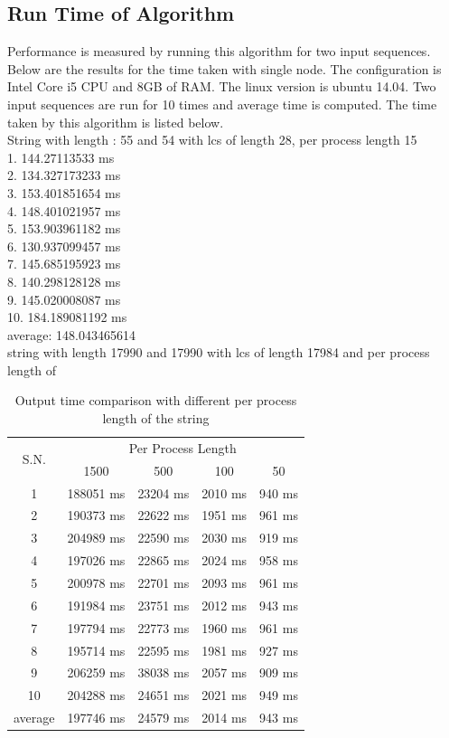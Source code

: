 \documentclass[journal,twoside]{IEEEtran}
\begin{document}
\subsection{Run Time of Algorithm}
Performance is measured by running this algorithm for two input sequences. Below are the results for the time taken with single node. The configuration is Intel Core i5 CPU and 8GB of RAM. The linux version is ubuntu 14.04. Two input sequences are run  for 10 times and average time is computed. The time taken by this algorithm is listed below. 
\\
String with length : 55 and 54 with lcs of length 28, per process length 15\\
1. 144.27113533  ms\\
2. 134.327173233  ms\\
3. 153.401851654  ms\\
4. 148.401021957  ms\\
5. 153.903961182  ms\\
6. 130.937099457  ms\\
7. 145.685195923  ms\\
8. 140.298128128  ms\\
9. 145.020008087  ms\\
10. 184.189081192  ms\\
average:  148.043465614\\

string with length 17990 and 17990 with lcs of length 17984 and per process length of

\begin{table}[h]
\caption{Output time comparison with different per process length of the string}
\begin{center}
    \begin{tabular}{| c | c | c | c | c| }
    \hline
\multirow{2}{*}{S.N.} & \multicolumn{4}{|c|}{Per Process Length} \\ \cline{2-5}
& 1500 & 500  & 100 & 50 \\ \hline
1 & 188051 ms & 23204 ms & 2010 ms & 940 ms \\ \hline
2 & 190373 ms & 22622 ms & 1951 ms & 961 ms \\ \hline
3 & 204989 ms & 22590 ms & 2030 ms & 919 ms  \\ \hline
4 & 197026 ms & 22865 ms & 2024 ms & 958 ms  \\ \hline
5 & 200978 ms & 22701 ms & 2093 ms & 961 ms  \\ \hline
6 & 191984 ms & 23751 ms & 2012 ms & 943 ms \\ \hline
7 & 197794 ms & 22773 ms & 1960 ms &  961 ms  \\ \hline
8 & 195714 ms & 22595 ms & 1981 ms & 927 ms  \\ \hline
9 & 206259 ms & 38038 ms & 2057 ms & 909 ms \\ \hline
10 & 204288 ms & 24651 ms & 2021 ms & 949 ms \\ \hline
average & 197746 ms & 24579 ms & 2014 ms & 943 ms \\ \hline
\end{tabular}
\end{center}
\label{tab:lcs}
\end{table}
\end{document}
